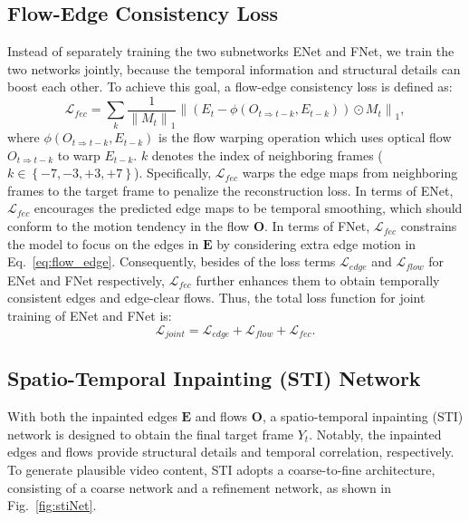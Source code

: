 \subsection{Flow-Edge Consistency Loss}
Instead of separately training the two subnetworks ENet and FNet, we train the two networks jointly, because the temporal information and structural details can boost each other.
To achieve this goal, a flow-edge consistency loss is defined as:
\begin{equation}
\label{eq:flow_edge}
\mathcal{L}_{fec}=\sum_{k}\frac{1}{\left\|M_{t} \right\|_1}\left\|(E_{t}-\phi(O_{t\Rightarrow t-k},E_{t-k}))\odot M_{t}\right\|_1,
\end{equation}
where $\phi(O_{t\Rightarrow t-k},E_{t-k})$ is the flow warping operation which uses optical flow $O_{t\Rightarrow t-k}$ to warp $E_{t-k}$.
$k$ denotes the index of neighboring frames ($k\in \left\{-7,-3,+3,+7 \right\}$). 
Specifically, $\mathcal{L}_{fec}$ warps the edge maps from neighboring frames to the target frame to penalize the reconstruction loss.
In terms of ENet, $\mathcal{L}_{fec}$ encourages the predicted edge maps to be temporal smoothing, which should conform to the motion tendency in the flow $\boldsymbol{O}$. 
In terms of FNet, $\mathcal{L}_{fec}$ constrains the model to focus on the edges in $\boldsymbol{E}$ by considering extra edge motion in Eq.~\ref{eq:flow_edge}. 
Consequently, besides of the loss terms $\mathcal{L}_{edge}$ and $\mathcal{L}_{flow}$ for ENet and FNet respectively, $\mathcal{L}_{fec}$ further enhances them to obtain temporally consistent edges and edge-clear flows.
Thus, the total loss function for joint training of ENet and FNet is:
\begin{equation}
\label{eq:flow}
\mathcal{L}_{joint}=\mathcal{L}_{edge}+\mathcal{L}_{flow}+ \mathcal{L}_{fec}.
\end{equation}












\subsection{Spatio-Temporal Inpainting (STI) Network}

With both the inpainted edges $\boldsymbol{E}$ and flows $\boldsymbol{O}$, a spatio-temporal inpainting (STI) network is designed to obtain the final target frame $Y_t$.
Notably, the inpainted edges and flows provide structural details and temporal correlation, respectively.
To generate plausible video content, STI adopts a coarse-to-fine architecture, consisting of a coarse network and a refinement network, as shown in Fig.~\ref{fig:stiNet}.

